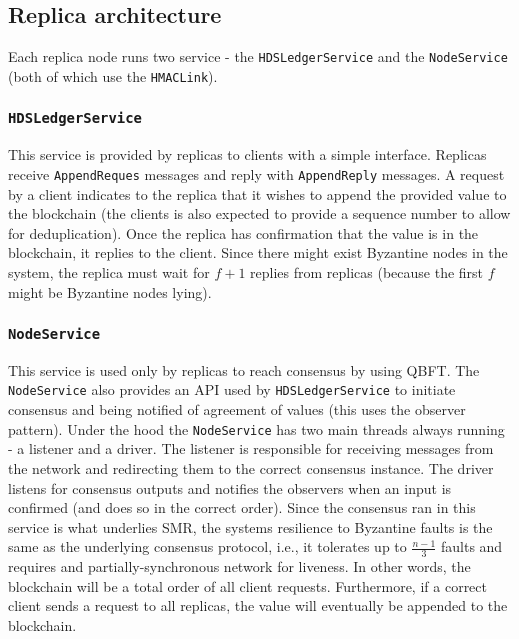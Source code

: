 \documentclass{article}
\begin{document}
\subsection{Replica architecture}

Each replica node runs two service - the \texttt{HDSLedgerService} and the \texttt{NodeService} (both of which use the \texttt{HMACLink}).

\subsubsection{\texttt{HDSLedgerService}}

This service is provided by replicas to clients with a simple interface.
Replicas receive \texttt{AppendReques} messages and reply with \texttt{AppendReply}
messages. A request by a client indicates to the replica that it wishes to append
the provided value to the blockchain (the clients is also expected to provide a
sequence number to allow for deduplication). Once the replica has confirmation that
the value is in the blockchain, it replies to the client. Since there might exist
Byzantine nodes in the system, the replica must wait for $f + 1$ replies from
replicas (because the first $f$ might be Byzantine nodes lying).

\subsubsection{\texttt{NodeService}}

This service is used only by replicas to reach consensus by using QBFT. The \texttt{NodeService}
also provides an API used by \texttt{HDSLedgerService} to initiate consensus and being
notified of agreement of values (this uses the observer pattern). Under the hood the
\texttt{NodeService} has two main threads always running - a listener and a driver.
The listener is responsible for receiving messages from the network and redirecting
them to the correct consensus instance. The driver listens for consensus outputs and 
notifies the observers when an input is confirmed (and does so in the correct order).
Since the consensus ran in this service is what underlies SMR, the systems resilience
to Byzantine faults is the same as the underlying consensus protocol, i.e., 
it tolerates up to $\frac{n-1}{3}$ faults and requires and partially-synchronous network
for liveness. In other words, the blockchain will be a total order of all client requests.
Furthermore, if a correct client sends a request to all replicas, the value will eventually be appended to the blockchain.
\end{document}
